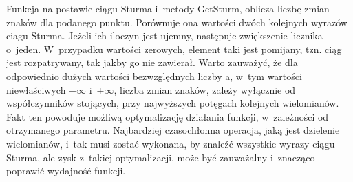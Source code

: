 Funkcja na postawie ciągu Sturma i~metody GetSturm, oblicza liczbę zmian znaków dla podanego punktu. Porównuje ona wartości dwóch kolejnych wyrazów ciagu Sturma. Jeżeli ich iloczyn jest ujemny, następuje zwiększenie licznika o~jeden. W~przypadku wartości zerowych, element taki jest pomijany, tzn. ciąg jest rozpatrywany, tak jakby go nie zawierał. Warto zauważyć, że dla odpowiednio dużych wartości bezwzględnych liczby a, w~tym wartości niewłaściwych $-\infty$ i~$+\infty$, liczba zmian znaków, zależy wyłącznie od współczynników stojących, przy najwyższych potęgach kolejnych wielomianów. Fakt ten powoduje możliwą optymalizację działania funkcji, w~zależności od otrzymanego parametru. Najbardziej czasochłonna operacja, jaką jest dzielenie wielomianów, i~tak musi zostać wykonana, by znaleźć wszystkie wyrazy ciągu Sturma, ale zysk z~takiej optymalizacji, może być zauważalny i~znacząco poprawić wydajność funkcji.